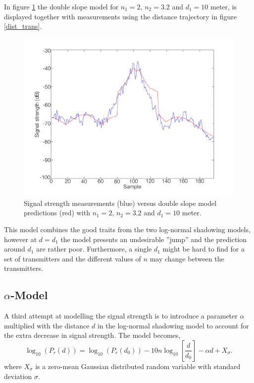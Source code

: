\documentclass{LTHthesis}
\begin{document}
In figure \ref{double_slope} the double slope model for $n_1=2$, $n_2=3.2$ and $d_1=10$ meter, is displayed together with measurements using the distance trajectory in figure \ref{dist_trans}.
%
\begin{figure}[!hbt]

\includegraphics[width=1\textwidth ]{images/signal_model/double_slope}
\caption{Signal strength measurements (blue) versus double slope model predictions (red) with $n_1=2$, $n_2=3.2$ and $d_1=10$ meter.}\label{double_slope}
\end{figure}

This model combines the good traits from the two log-normal shadowing models, however at $d=d_1$ the model presents an undesirable ''jump'' and the prediction around $d_1$ are rather poor. Furthermore, a single $d_1$ might be hard to find for a set of transmitters and the different values of $n$ may change between the transmitters.
%
\subsection{$\alpha$-Model} %
%
A third attempt at modelling the signal strength is to introduce a parameter $\alpha$ multiplied with the distance $d$ in the log-normal shadowing model to account for the extra decrease in signal strength.  The model becomes,
%
\begin{equation}
\log_{10}({P_r(d)})=\log_{10}({P_r(d_0)})-10n\log_{10}\left[{\frac{d}{d_0}}\right] - \alpha d+ X_\sigma.
\end{equation}
%
where $X_\sigma$ is a zero-mean Gaussian distributed random variable with standard deviation $\sigma$.
\end{document}
